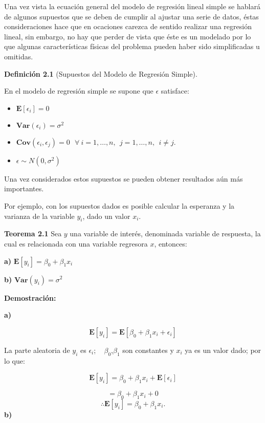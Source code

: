 \documentclass[
  a4paper,
  oneside,
  openany]{book}
\begin{document}
Una vez vista la ecuación general del modelo de regresión lineal simple se hablará de algunos supuestos que se deben de cumplir al ajustar una serie de datos, éstas consideraciones hace que en ocaciones carezca de sentido realizar una regresión lineal, sin embargo, no hay que perder de vista que éste es un modelado por lo que algunas características físicas del problema pueden haber sido simplificadas u omitidas.

\textbf{Definición 2.1} (Supuestos del Modelo de Regresión Simple).

En el modelo de regresión simple se supone que \(\epsilon\) satisface:

\begin{itemize}
\item
  \(\mathbf{E}[\epsilon_{i}]=0\)
\item
  \(\textbf{Var}(\epsilon_{i})=\sigma^2\)
\item
  \(\textbf{Cov}(\epsilon_{i},\epsilon_{j})= 0 \  \ \ \forall \ i = 1, \ldots, n, \ \  j=1, \ldots, n, \ \  i \neq j.\)
\item
  \(\epsilon \sim N(0,\sigma^2)\)
\end{itemize}

Una vez considerados estos supuestos se pueden obtener resultados aún más importantes.

Por ejemplo, con los supuestos dados es posible calcular la esperanza y la varianza de la variable \(y_{i}\), dado un valor \(x_{i}\).

\textbf{Teorema 2.1} Sea \(y\) una variable de interés, denominada variable de respuesta, la cual es relacionada con una variable regresora \(x\), entonces:

\textbf{a)} \(\mathbf{E}[y_{i}]=\beta_{0}+\beta_{1}x_{i}\)

\textbf{b)} \(\textbf{Var}(y_{i})=\sigma^2\)

\textbf{Demostración:}

\textbf{a)}

\[\mathbf{E}[y_{i}]=\mathbf{E}[\beta_{0}+\beta_{1}x_{i}+\epsilon_{i}]\]

La parte aleatoria de \(y_{i}\) es \(\epsilon_{i}\); ~ \(\beta_{0}\),\(\beta_{1}\) son constantes y \(x_{i}\) ya es un valor dado; por lo que:

\[\mathbf{E}[y_{i}]=\beta_{0}+\beta_{1}x_{i}+\mathbf{E}[\epsilon_{i}]\]

\[=\beta_{0}+\beta_{1}x_{i}+0\]
\[\therefore \mathbf{E}[y_{i}]=\beta_{0}+\beta_{1}x_{i}.\]
\textbf{b)}
\end{document}
